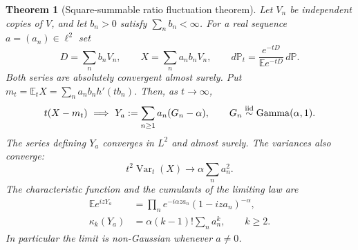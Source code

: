 \documentclass[11pt,letterpaper]{article}
\newtheorem{theorem}{Theorem}[section]
\theoremstyle{definition}
\theoremstyle{remark}
\newcommand{\1}{\mathbf 1}
\begin{document}
\begin{theorem}[Square-summable ratio fluctuation theorem]
\label{p05:thm:square-summable-ratio-fluctuations}
Let $V_n$ be independent copies of $V$, and let $b_n>0$ satisfy
$\sum_n b_n<\infty$.  For a real sequence $a=(a_n)\in\ell^2$ set
\[
 D=\sum_n b_nV_n,\qquad X=\sum_n a_nb_nV_n,
 \qquad
 d\mathbb P_t=\frac{e^{-tD}}{\mathbb E e^{-tD}}\,d\mathbb P.
\]
Both series are absolutely convergent almost surely.  Put
$m_t=\mathbb E_tX=\sum_n a_nb_nh'(tb_n)$.
Then, as $t\to\infty$,
\begin{equation}\label{p05:eq:canonical-gamma-series-limit}
 t(X-m_t)\ \Longrightarrow\
 Y_a:=\sum_{n\ge1}a_n(G_n-\alpha),
 \qquad G_n\overset{\rm iid}{\sim}\operatorname{Gamma}(\alpha,1).
\end{equation}
The series defining $Y_a$ converges in $L^2$ and almost surely.
The variances also converge:
\[
 t^2\operatorname{Var}_t(X)\longrightarrow
 \alpha\sum_n a_n^2.
\]
The characteristic function and the cumulants of the limiting law are
\begin{align}
 \mathbb E e^{izY_a}
 &=\prod_n e^{-i\alpha za_n}(1-iza_n)^{-\alpha},
 \label{p05:eq:gamma-series-characteristic-function}\\
 \kappa_k(Y_a)&=\alpha(k-1)!\sum_n a_n^k,
 \qquad k\ge2.
 \label{p05:eq:gamma-series-cumulants}
\end{align}
In particular the limit is non-Gaussian whenever $a\ne0$.
\end{theorem}
\end{document}
